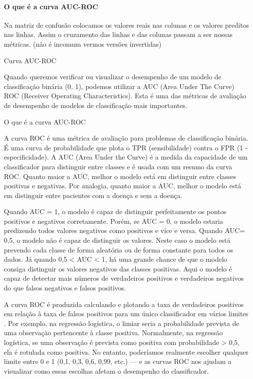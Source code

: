 \documentclass[
  letterpaper,
  DIV=11,
  numbers=noendperiod]{scrreprt}
\let\oldparagraph\paragraph
\renewcommand{\paragraph}[1]{\oldparagraph{#1}\mbox{}}
\begin{document}
\hypertarget{o-que-uxe9-a-curva-auc-roc}{%
\paragraph{O que é a curva AUC-ROC}\label{o-que-uxe9-a-curva-auc-roc}}

Na matriz de confusão colocamos os valores reais nas colunas e os
valores preditos nas linhas. Assim o cruzamento das linhas e das colunas
passam a ser nossas métricas. (não é incomum vermos versões invertidas)

\hfill\break

Curva AUC-ROC

\hfill\break

Quando queremos verificar ou visualizar o desempenho de um modelo de
classificação binária (0, 1), podemos utilizar a AUC (Area Under The
Curve) ROC (Receiver Operating Characteristics). Esta é uma das métricas
de avaliação de desempenho de modelos de classificação mais importantes.

\hfill\break

O que é a curva AUC-ROC

A curva ROC é uma métrica de avaliação para problemas de classificação
binária. É uma curva de probabilidade que plota o TPR (sensibilidade)
contra o FPR (1 - especificidade). A AUC (Area Under the Curve) é a
medida da capacidade de um classificador para distinguir entre classes e
é usada com um resumo da curva ROC. Quanto maior a AUC, melhor o modelo
está em distinguir entre classes positivas e negativas. Por analogia,
quanto maior a AUC, melhor o modelo está em distinguir entre pacientes
com a doença e sem a doença.

Quando AUC = 1, o modelo é capaz de distinguir perfeitamente os pontos
positivos e negativos corretamente. Porém, se AUC = 0, o modelo estaria
predizendo todos valores negativos como positivos e vice e versa. Quando
AUC= 0,5, o modelo não é capaz de distinguir os valores. Neste caso o
modelo está prevendo cada classe de forma aleatória ou de forma
constante para todos os dados. Já quando 0,5 \textless{} AUC \textless{}
1, há uma grande chance de que o modelo consiga distinguir os valores
negativos das classes positivas. Aqui o modelo é capaz de detectar mais
números de verdadeiros positivos e verdadeiros negativos do que falsos
negativos e falsos positivos.

A curva ROC é produzida calculando e plotando a taxa de verdadeiros
positivos em relação à taxa de falsos positivos para um único
classificador em vários limites . Por exemplo, na regressão logística, o
limiar seria a probabilidade prevista de uma observação pertencente à
classe positiva. Normalmente, na regressão logística, se uma observação
é prevista como positiva com probabilidade \textgreater{} 0,5, ela é
rotulada como positiva. No entanto, poderíamos realmente escolher
qualquer limite entre 0 e 1 (0,1, 0,3, 0,6, 0,99, etc.) --- e as curvas
ROC nos ajudam a visualizar como essas escolhas afetam o desempenho do
classificador.
\end{document}
